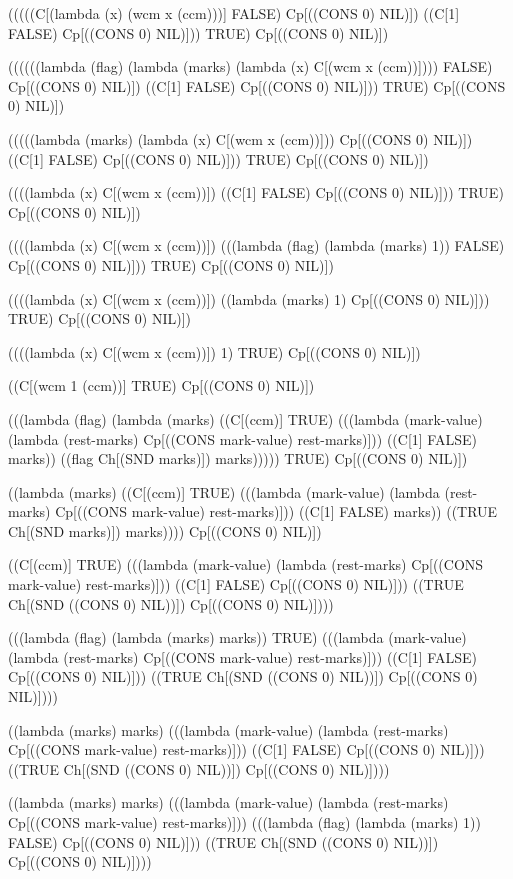 \documentclass[ms,electronic,twosidetoc,letterpaper,chaptercenter,parttop]{byumsphd}
\begin{document}
\begin{schemedisplay}
(((((C[(lambda (x) (wcm x (ccm)))] FALSE) Cp[((CONS 0) NIL)])
   ((C[1] FALSE) Cp[((CONS 0) NIL)]))
  TRUE) Cp[((CONS 0) NIL)])

((((((lambda (flag) (lambda (marks) (lambda (x) C[(wcm x (ccm))]))) FALSE) Cp[((CONS 0) NIL)])
   ((C[1] FALSE) Cp[((CONS 0) NIL)]))
  TRUE) Cp[((CONS 0) NIL)])

(((((lambda (marks) (lambda (x) C[(wcm x (ccm))])) Cp[((CONS 0) NIL)])
   ((C[1] FALSE) Cp[((CONS 0) NIL)]))
  TRUE) Cp[((CONS 0) NIL)])

((((lambda (x) C[(wcm x (ccm))])
   ((C[1] FALSE) Cp[((CONS 0) NIL)]))
  TRUE) Cp[((CONS 0) NIL)])

((((lambda (x) C[(wcm x (ccm))])
   (((lambda (flag) (lambda (marks) 1)) FALSE) Cp[((CONS 0) NIL)]))
  TRUE) Cp[((CONS 0) NIL)])

((((lambda (x) C[(wcm x (ccm))])
   ((lambda (marks) 1) Cp[((CONS 0) NIL)]))
  TRUE) Cp[((CONS 0) NIL)])

((((lambda (x) C[(wcm x (ccm))])
   1) TRUE) Cp[((CONS 0) NIL)])

((C[(wcm 1 (ccm))]
   TRUE) Cp[((CONS 0) NIL)])

(((lambda (flag)
    (lambda (marks)
      ((C[(ccm)] TRUE)
       (((lambda (mark-value) (lambda (rest-marks) Cp[((CONS mark-value) rest-marks)]))
         ((C[1] FALSE) marks))
        ((flag Ch[(SND marks)]) marks)))))
  TRUE) Cp[((CONS 0) NIL)])

((lambda (marks)
   ((C[(ccm)] TRUE)
    (((lambda (mark-value) (lambda (rest-marks) Cp[((CONS mark-value) rest-marks)]))
      ((C[1] FALSE) marks))
     ((TRUE Ch[(SND marks)]) marks))))
 Cp[((CONS 0) NIL)])

((C[(ccm)] TRUE)
 (((lambda (mark-value) (lambda (rest-marks) Cp[((CONS mark-value) rest-marks)]))
   ((C[1] FALSE) Cp[((CONS 0) NIL)]))
  ((TRUE Ch[(SND ((CONS 0) NIL))]) Cp[((CONS 0) NIL)])))

(((lambda (flag) (lambda (marks) marks))
  TRUE)
 (((lambda (mark-value) (lambda (rest-marks) Cp[((CONS mark-value) rest-marks)]))
   ((C[1] FALSE) Cp[((CONS 0) NIL)]))
  ((TRUE Ch[(SND ((CONS 0) NIL))]) Cp[((CONS 0) NIL)])))

((lambda (marks) marks)
 (((lambda (mark-value) (lambda (rest-marks) Cp[((CONS mark-value) rest-marks)]))
   ((C[1] FALSE) Cp[((CONS 0) NIL)]))
  ((TRUE Ch[(SND ((CONS 0) NIL))]) Cp[((CONS 0) NIL)])))

((lambda (marks) marks)
 (((lambda (mark-value) (lambda (rest-marks) Cp[((CONS mark-value) rest-marks)]))
   (((lambda (flag) (lambda (marks) 1)) FALSE) Cp[((CONS 0) NIL)]))
  ((TRUE Ch[(SND ((CONS 0) NIL))]) Cp[((CONS 0) NIL)])))


\end{schemedisplay}
\end{document}
